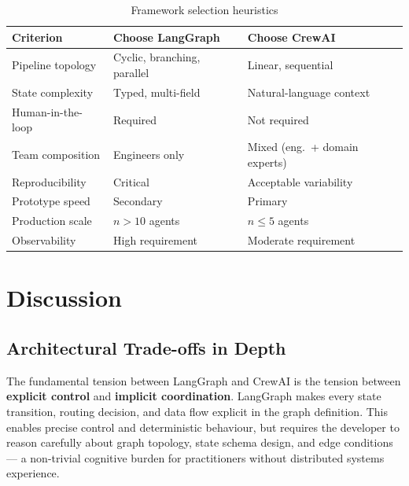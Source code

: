 \documentclass[12pt,a4paper]{article}
\begin{document}
\begin{table}[H]
    \centering
    \caption{Framework selection heuristics}
    \label{tab:heuristics}
    \renewcommand{\arraystretch}{1.4}
    \begin{tabularx}{\textwidth}{l X X}
        \toprule
        \textbf{Criterion}  & \textbf{Choose LangGraph} & \textbf{Choose CrewAI} \\
        \midrule
        Pipeline topology   & Cyclic, branching, parallel & Linear, sequential \\
        State complexity    & Typed, multi-field          & Natural-language context \\
        Human-in-the-loop   & Required                    & Not required \\
        Team composition    & Engineers only              & Mixed (eng.\ + domain experts) \\
        Reproducibility     & Critical                    & Acceptable variability \\
        Prototype speed     & Secondary                   & Primary \\
        Production scale    & $n > 10$ agents             & $n \leq 5$ agents \\
        Observability       & High requirement            & Moderate requirement \\
        \bottomrule
    \end{tabularx}
\end{table}

\section{Discussion}

\subsection{Architectural Trade-offs in Depth}

The fundamental tension between LangGraph and CrewAI is the tension between
\textbf{explicit control} and \textbf{implicit coordination}. LangGraph makes
every state transition, routing decision, and data flow explicit in the graph
definition. This enables precise control and deterministic behaviour, but
requires the developer to reason carefully about graph topology, state schema
design, and edge conditions --- a non-trivial cognitive burden for practitioners
without distributed systems experience.
\end{document}
